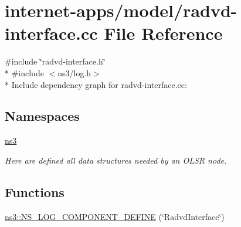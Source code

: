 \hypertarget{radvd-interface_8cc}{}\section{internet-\/apps/model/radvd-\/interface.cc File Reference}
\label{radvd-interface_8cc}
{\ttfamily \#include \char`\"{}radvd-\/interface.\+h\char`\"{}}\\*
{\ttfamily \#include $<$ns3/log.\+h$>$}\\*
Include dependency graph for radvd-\/interface.cc\+:
\subsection*{Namespaces}
\begin{DoxyCompactItemize}
\item 
 \hyperlink{namespacens3}{ns3}
\begin{DoxyCompactList}\small\item\em Here are defined all data structures needed by an O\+L\+SR node. \end{DoxyCompactList}\end{DoxyCompactItemize}
\subsection*{Functions}
\begin{DoxyCompactItemize}
\item 
\hyperlink{namespacens3_a9ac3fc9e718a94fc82dc9d459a9c3152}{ns3\+::\+N\+S\+\_\+\+L\+O\+G\+\_\+\+C\+O\+M\+P\+O\+N\+E\+N\+T\+\_\+\+D\+E\+F\+I\+NE} (\char`\"{}Radvd\+Interface\char`\"{})
\end{DoxyCompactItemize}
